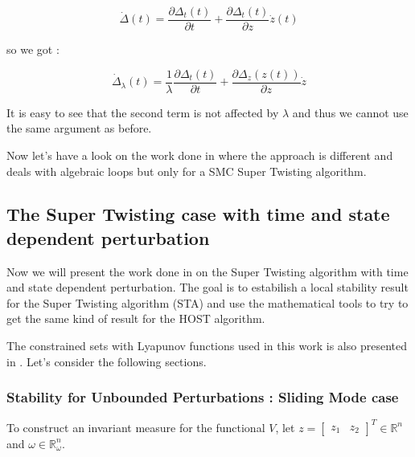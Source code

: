 \begin{equation}
    \dot{\Delta}(t) = \frac{\partial \Delta_t(t)}{\partial t} + \frac{\partial \Delta_t(t)}{\partial z} \dot{z}(t)
\end{equation}

so we got : 

\begin{equation}
    \dot{\Delta}_{\lambda}(t) = \frac{1}{\lambda} \frac{\partial \Delta_t(t)}{\partial t} + \frac{\partial \Delta_z(z(t))}{\partial z} \dot{z}
\end{equation}

It is easy to see that the second term is not affected by \(\lambda\) and thus we cannot use the same argument 
as before.

Now let's have a look on the work done in \cite{tietze2025dynamic} where the approach is different and deals 
with algebraic loops but only for a SMC Super Twisting algorithm.






















\subsection{The Super Twisting case with time and state dependent perturbation}

Now we will present the work done in \cite{tietze2025dynamic} on the Super Twisting algorithm with time and state
dependent perturbation. The goal is to estabilish a local stability result for the Super Twisting algorithm (STA)
and use the mathematical tools to try to get the same kind of result for the HOST algorithm.

The constrained sets with Lyapunov functions used in this work is also presented in \cite{khalil2002nonlinear}. 
Let's consider the following sections.


\subsubsection{Stability for Unbounded Perturbations : Sliding Mode case}

To construct an invariant measure for the functional \( V \), let
\(z = \begin{bmatrix} z_1 & z_2 \end{bmatrix}^T \in \mathbb{R}^n\) and \(\omega \in \mathbb{R}^n_\omega\).

